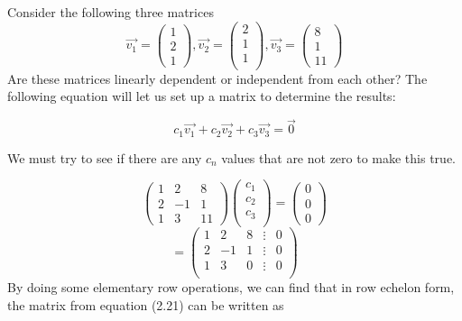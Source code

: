   \begin{problem}
    Consider the following three matrices
    \begin{equation}
      \vec{v_1}=\begin{pmatrix}
        1\\2\\1
      \end{pmatrix}
      ,\vec{v_2}=\begin{pmatrix}
        2\\1\\1\\
      \end{pmatrix}
      ,\vec{v_3}=\begin{pmatrix}
        8\\1\\11
      \end{pmatrix}
    \end{equation}
    Are these matrices linearly dependent or independent from each other? The following equation will let us set up a matrix to determine the results:

    \begin{equation}
      c_1\vec{v_1}+c_2\vec{v_2}+c_3\vec{v_3}=\vec{0}
    \end{equation}

    We must try to see if there are any $c_n$ values that are not zero to make this true.

    \begin{equation}
      \begin{pmatrix}
        1&2&8\\2&-1&1\\1&3&11
      \end{pmatrix}
      \begin{pmatrix}
        c_1\\c_2\\c_3\\
      \end{pmatrix}
      =\begin{pmatrix}
        0\\0\\0
      \end{pmatrix}
    \end{equation}
    \begin{equation}
      = \begin{pmatrix}
        1&2&8&\vdots&0\\
        2&-1&1&\vdots&0\\
        1&3&0&\vdots&0\\
      \end{pmatrix}
    \end{equation}
    By doing some elementary row operations, we can find that in row echelon form, the matrix from equation (2.21) can be written as


\end{problem}
